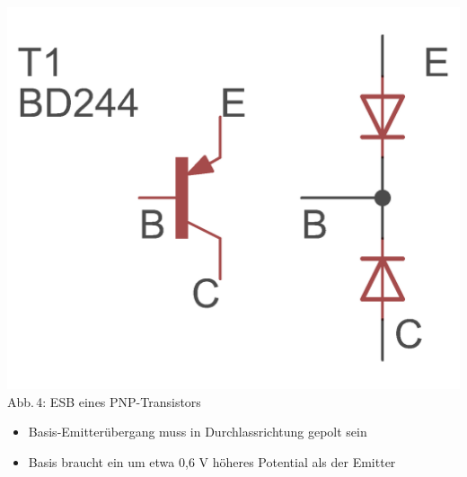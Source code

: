 \begin{frame}
\begin{minipage}{0.4\textwidth}
	\includegraphics[width=\textwidth,height=.5\textheight,keepaspectratio]{e13/PNP_esb.png}\\
	{\tiny Abb.\,4: ESB eines PNP-Transistors}
\end{minipage}
\vspace{2mm}
\begin{itemize}
	\item	Basis-Emitterübergang muss in Durchlassrichtung gepolt sein
	\item	Basis braucht ein um etwa 0,6 V höheres Potential als der Emitter
\end{itemize}

\end{frame}


